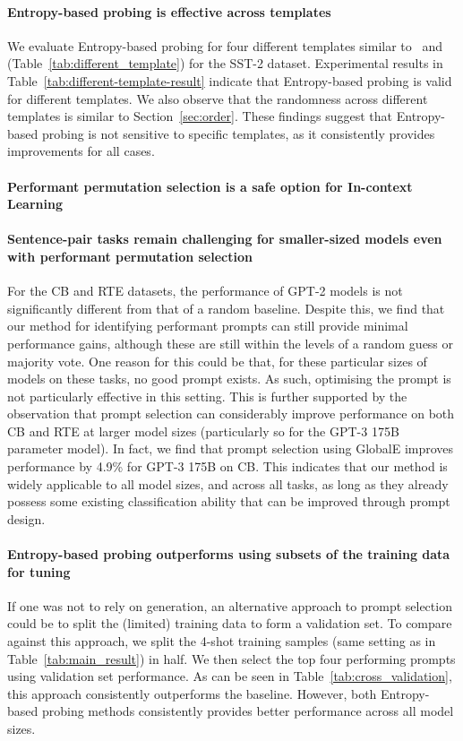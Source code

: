 \paragraph{Entropy-based probing is effective across templates}{ We evaluate Entropy-based probing for four different templates similar to~\citet{gao2020making} and~\citet{zhao2021calibrate} (Table~\ref{tab:different_template}) for the SST-2 dataset. Experimental results in Table~\ref{tab:different-template-result} indicate that Entropy-based probing is valid for different templates. We also observe that the randomness across different templates is similar to Section~\ref{sec:order}.
These findings suggest that Entropy-based probing is not sensitive to specific templates, as it consistently provides improvements for all cases. }

\paragraph{Performant permutation selection is a safe option for In-context Learning}

\paragraph{Sentence-pair tasks remain challenging for smaller-sized models even with performant permutation selection}

For the CB and RTE datasets, the performance of GPT-2 models is not significantly different from that of a random baseline. Despite this, we find that our method for identifying performant prompts can still provide minimal performance gains, although these are still within the levels of a random guess or majority vote. One reason for this could be that, for these particular sizes of models on these tasks, no good prompt exists. As such, optimising the prompt is not particularly effective in this setting. This is further supported by the observation that prompt selection can considerably improve performance on both CB and RTE at larger model sizes (particularly so for the GPT-3 175B parameter model). In fact, we find that prompt selection using GlobalE improves performance by 4.9\% for GPT-3 175B on CB. This indicates that our method is widely applicable to all model sizes, and across all tasks, as long as they already possess some existing classification ability that can be improved through prompt design. 

\paragraph{Entropy-based probing outperforms using subsets of the training data for tuning} If one was not to rely on generation, an alternative approach to prompt selection could be to split the (limited) training data to form a validation set. To compare against this approach, we split the 4-shot training samples (same setting as in Table~\ref{tab:main_result}) in half. We then select the top four performing prompts using validation set performance. As can be seen in Table~\ref{tab:cross_validation}, this approach consistently outperforms the baseline. However, both Entropy-based probing methods consistently provides better performance across all model sizes.

